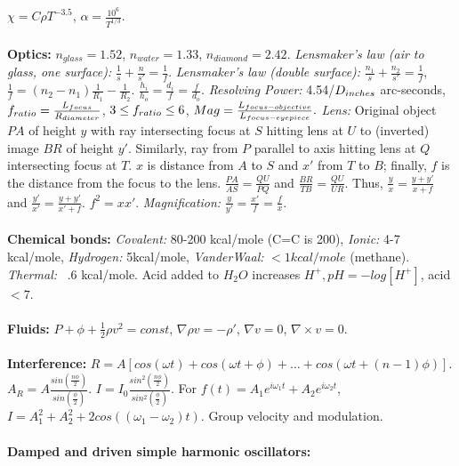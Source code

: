 $\chi = C \rho T^{-3.5}$, $\alpha = {\frac {10^{6}} {T^{1/3}}}$.
\\
\\
{\bf Optics:} $n_{glass}= 1.52$, $n_{water}= 1.33$, $n_{diamond}=2.42$.  
\emph{Lensmaker's law (air to glass, one surface):}
${\frac 1 s} + {\frac n {s'}}= {\frac 1 f}$.
\emph{Lensmaker's law (double surface):}
${\frac {n_1} s} + {\frac {n_2} {s'}}= {\frac 1 f}$,
${\frac 1 f}= (n_2 - n_1 ){\frac 1 {R_1}}-{\frac 1 {R_2}}$.
${\frac {h_i} {h_o}}= {\frac {d_i} {f}}={\frac {f} {d_o}}$.
\emph{Resolving Power:}  4.54/$D_{\small {inches}}$ arc-seconds,
$f_{\small{ratio}} = {\frac {L_{\small {focus}}}  {R_{\small {diameter}}}}$,
$3 \leq f_{\small {ratio}} \leq 6$,
$Mag= {\frac {L_{\small {focus-objective}}} {L_{\small {focus-eyepiece}}}}.$
\emph{Lens:}  Original object $PA$ of height $y$ with ray intersecting focus at $S$ hitting 
lens at $U$ to
(inverted) image $BR$ of height
$y'$.  Similarly, ray from $P$ parallel to axis hitting lens at $Q$ intersecting
focus at $T$.  $x$ is distance from $A$ to $S$ and $x'$ from $T$ to $B$; finally, $f$ is the
distance from the focus to the lens.
$ {\frac {PA}{AS}}= {\frac {QU}{PQ}} $ and
$ {\frac {BR}{TB}}= {\frac {QU}{UR}} $.  Thus,
$ {\frac {y}{x}}= {\frac {y+y'}{x+f}} $ and
$ {\frac {y'}{x'}}= {\frac {y+y'}{x'+f}} $.  $f^2 = x x'$.  
\emph{Magnification:}
${\frac {y}{y'}}= {\frac {x'} {f}}= {\frac {f}{x}}$.
\\
\\
{\bf Chemical bonds:}
\emph{Covalent:} 80-200  kcal/mole (C=C is 200), 
\emph{Ionic:} 4-7 kcal/mole,
\emph{Hydrogen:} 5kcal/mole, 
\emph{VanderWaal:} $<1kcal/mole$ (methane).
\emph{Thermal:} ~.6 kcal/mole.
Acid added to $H_{2}O$ increases $H^{+}, pH= -log[H^+]$, acid $< 7$.
\\
\\
{\bf Fluids:}  $P + \phi + {\frac {1}{2}} \rho v^{2} = const$,
$\nabla \rho v = - \rho '$,
$\nabla v = 0$,
$\nabla \times v=0.$\\
\\
{\bf Interference:} $R=A[
cos(\omega t) + cos(\omega t + \phi) + \ldots + cos(\omega t + (n-1)\phi)]$.
$A_R= A {\frac {sin({\frac {n \phi} {2}})} {sin({\frac {\phi} {2}})}}$.
$I= I_0 
{\frac {sin^2({\frac {n \phi} {2}})} {sin^2({\frac {\phi} {2}})}
}$.  For 
$f(t)= A_1 e^{i \omega_1 t} + A_2 e^{i \omega_2 t}$,
$I= A_1^2 + A_2^2 + 2 cos((\omega_1 - \omega_2)t)$.  Group velocity and modulation.
\\
\\
{\bf Damped and driven simple harmonic oscillators:}  
